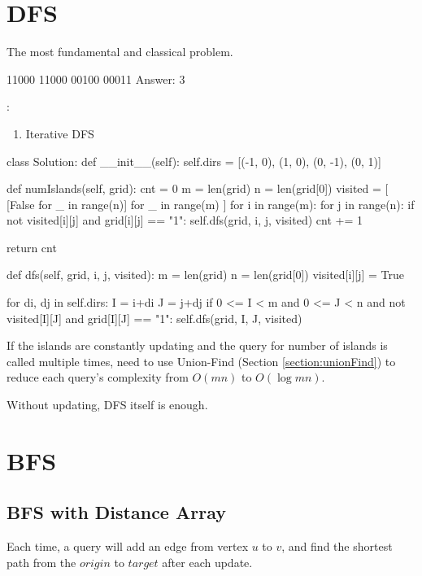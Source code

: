 \section{DFS}
 The most fundamental and classical problem.
\begin{python}
11000
11000
00100
00011
Answer: 3
\end{python}
:
\begin{enumerate}
\item Iterative DFS
\end{enumerate}
\begin{python}
class Solution:
  def __init__(self):
    self.dirs = [(-1, 0), (1, 0), (0, -1), (0, 1)]

  def numIslands(self, grid):
    cnt = 0
    m = len(grid)
    n = len(grid[0])
    visited = [
      [False for _ in range(n)]
      for _ in range(m)
    ]
    for i in range(m):
      for j in range(n):
        if not visited[i][j] and grid[i][j] == "1":
          self.dfs(grid, i, j, visited)
          cnt += 1

    return cnt
\end{python}

\begin{python}
  def dfs(self, grid, i, j, visited):
    m = len(grid)
    n = len(grid[0])
    visited[i][j] = True

    for di, dj in self.dirs:
      I = i+di
      J = j+dj
      if 0 <= I < m and 0 <= J < n
        and not visited[I][J]
        and grid[I][J] == "1":
        self.dfs(grid, I, J, visited)
\end{python}
If the islands are constantly updating and the query for number of islands is called multiple times, need to use Union-Find (Section \ref{section:unionFind}) to reduce each query's complexity from $O(mn)$ to $O(\log mn)$.

Without updating, DFS itself is enough.

\section{BFS}
\subsection{BFS with Distance Array}
Each time, a query will add an edge from vertex $u$ to $v$, and find the shortest path from the $origin$ to $target$ after each update. 

